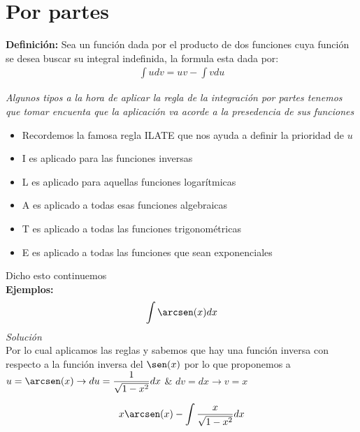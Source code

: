 \section{Por partes}
\textbf{Definición:} Sea un función dada por el producto de dos funciones cuya función se desea buscar su integral indefinida, la formula esta dada por:\\

\begin{equation*}
    \begin{gathered}
        \int u dv = uv - \int vdu
    \end{gathered}
\end{equation*}

\emph{Algunos tipos a la hora de aplicar la regla de la integración por partes tenemos que tomar encuenta que la aplicación va acorde a la presedencia de sus funciones}
\begin{itemize}
  \item Recordemos la famosa regla ILATE que nos ayuda a definir la prioridad de  \(\displaystyle u\)
  \item I es aplicado para las funciones inversas
  \item L es aplicado para aquellas funciones logarítmicas
  \item A es aplicado a todas esas funciones algebraicas
  \item T es aplicado a todas las funciones trigonométricas
  \item E es aplicado a todas las funciones que sean exponenciales
\end{itemize}

Dicho esto continuemos\\

\textbf{Ejemplos:}\\
\begin{equation}
    \begin{gathered}
        \int \arcsen(x)dx
    \end{gathered}
\end{equation}
\textit{Solución}\\

Por lo cual aplicamos las reglas y sabemos que hay una función inversa con respecto a la función inversa del \(\displaystyle\sen(x)\) por lo que proponemos a \(\displaystyle u=\arcsen(x)\rightarrow du = \frac{1}{\sqrt{1-x^{2}}}dx\) \& \(\displaystyle dv=dx \rightarrow v=x\)

\begin{equation*}
    \begin{gathered}
        x\arcsen(x)-\int \frac{x}{\sqrt{1-x^{2}}}dx
    \end{gathered}
\end{equation*}

